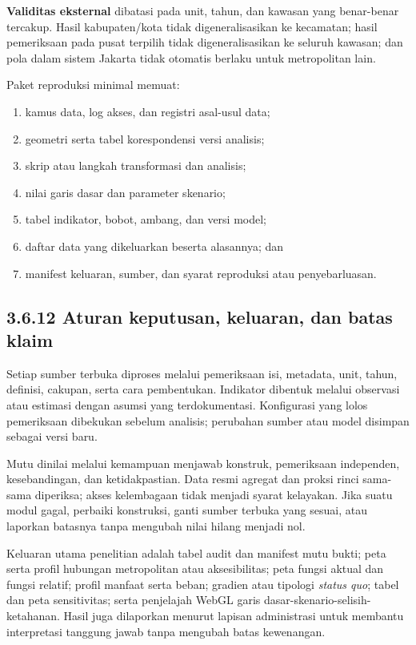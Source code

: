 \documentclass[
  indonesian,
  11pt,
  a4paper,
  oneside,
  openany]{report}
\providecommand{\tightlist}{%
  \setlength{\itemsep}{0pt}\setlength{\parskip}{0pt}}
\begin{document}
\textbf{Validitas eksternal} dibatasi pada unit, tahun, dan kawasan yang
benar-benar tercakup. Hasil kabupaten/kota tidak digeneralisasikan ke
kecamatan; hasil pemeriksaan pada pusat terpilih tidak digeneralisasikan
ke seluruh kawasan; dan pola dalam sistem Jakarta tidak otomatis berlaku
untuk metropolitan lain.

Paket reproduksi minimal memuat:

\begin{enumerate}
\def\labelenumi{\arabic{enumi}.}
\tightlist
\item
  kamus data, log akses, dan registri asal-usul data;
\item
  geometri serta tabel korespondensi versi analisis;
\item
  skrip atau langkah transformasi dan analisis;
\item
  nilai garis dasar dan parameter skenario;
\item
  tabel indikator, bobot, ambang, dan versi model;
\item
  daftar data yang dikeluarkan beserta alasannya; dan
\item
  manifest keluaran, sumber, dan syarat reproduksi atau penyebarluasan.
\end{enumerate}

\subsection{3.6.12 Aturan keputusan, keluaran, dan batas
klaim}\label{aturan-keputusan-keluaran-dan-batas-klaim}

Setiap sumber terbuka diproses melalui pemeriksaan isi, metadata, unit,
tahun, definisi, cakupan, serta cara pembentukan. Indikator dibentuk
melalui observasi atau estimasi dengan asumsi yang terdokumentasi.
Konfigurasi yang lolos pemeriksaan dibekukan sebelum analisis; perubahan
sumber atau model disimpan sebagai versi baru.

Mutu dinilai melalui kemampuan menjawab konstruk, pemeriksaan
independen, kesebandingan, dan ketidakpastian. Data resmi agregat dan
proksi rinci sama-sama diperiksa; akses kelembagaan tidak menjadi syarat
kelayakan. Jika suatu modul gagal, perbaiki konstruksi, ganti sumber
terbuka yang sesuai, atau laporkan batasnya tanpa mengubah nilai hilang
menjadi nol.

Keluaran utama penelitian adalah tabel audit dan manifest mutu bukti;
peta serta profil hubungan metropolitan atau aksesibilitas; peta fungsi
aktual dan fungsi relatif; profil manfaat serta beban; gradien atau
tipologi \emph{status quo}; tabel dan peta sensitivitas; serta
penjelajah WebGL garis dasar-skenario-selisih-ketahanan. Hasil juga
dilaporkan menurut lapisan administrasi untuk membantu interpretasi
tanggung jawab tanpa mengubah batas kewenangan.
\end{document}

